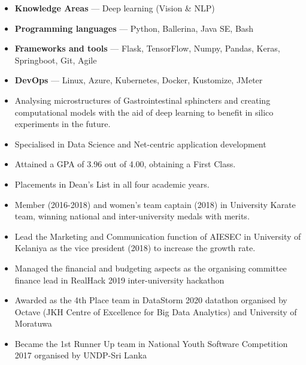 \documentclass[10pt,a4paper,ragged2e,withhyper]{altacv}
\begin{document}
\medskip


\begin{itemize}
    \item \textbf{Knowledge Areas } --- Deep learning (Vision \& NLP)
    \item \textbf{Programming languages} --- Python, Ballerina, Java SE, Bash
    \item \textbf{Frameworks and tools} --- Flask, TensorFlow, Numpy, Pandas, Keras, Springboot, Git, Agile
    \item \textbf{DevOps} --- Linux, Azure, Kubernetes, Docker, Kustomize, JMeter
\end{itemize}

\pagebreak



\begin{itemize}
    \item Analysing microstructures of Gastrointestinal sphincters and creating computational models with the aid of deep learning to benefit in silico experiments in the future.
\end{itemize}

\divider{}

\begin{itemize}
    \item Specialised in Data Science and Net-centric application development
    \item Attained a GPA of 3.96 out of 4.00, obtaining a First Class.
    \item Placements in Dean’s List in all four academic years.
    \item Member (2016-2018) and women's team captain (2018) in University Karate team, winning national and inter-university medals with merits. 
    \item Lead the Marketing and Communication function of AIESEC in University of Kelaniya as the vice president (2018) to increase the growth rate.
    \item Managed the financial and budgeting aspects as the organising committee finance lead in RealHack 2019 inter-university hackathon 
    \item Awarded as the 4th Place team in DataStorm 2020 datathon organised by Octave (JKH Centre of Excellence for Big Data Analytics) and University of Moratuwa
    \item Became the 1st Runner Up team in National Youth Software Competition 2017 organised by UNDP-Sri Lanka
\end{itemize}
\end{document}
